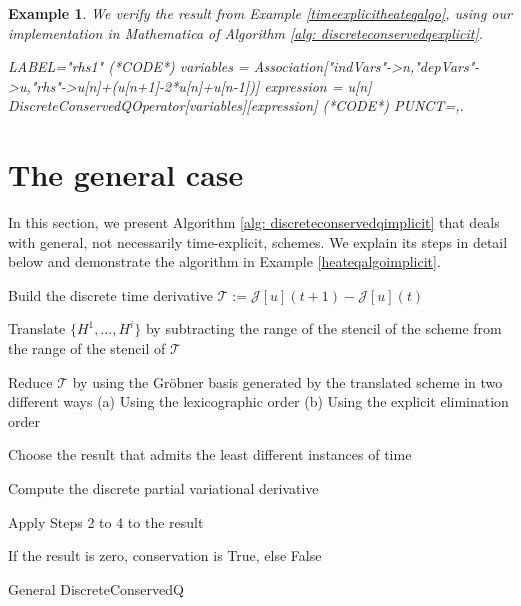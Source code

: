 \documentclass[manuscript]{acmart}
\newcommand{\Rr}{{\mathbb{R}}}
\newcommand{\Nn}{{\mathbb{N}}}
\newcommand{\1}{{\chi}}
\newcommand{\Ii}{{\mathcal{I}}}
\numberwithin{equation}{section}
\theoremstyle{thmlemcorr}
\numberwithin{theorem}{section}
\theoremstyle{thmlemcorr*}
\theoremstyle{defi}
\theoremstyle{remexample}
\newtheorem{example}[theorem]{Example}
\theoremstyle{ass}
\begin{document}
\begin{example}
	\label{heatex1}
	We verify the result from Example \ref{timeexplicitheateqalgo}, using our implementation in {\sc Mathematica} of Algorithm \ref{alg: discreteconservedqexplicit}.
	\begin{EXE}
		LABEL="rhs1"
		(*CODE*)
		variables = Association["indVars"->{n},"depVars"->{u},"rhs"->{u[n]+(u[n+1]-2*u[n]+u[n-1])}]
		expression = u[n]
		DiscreteConservedQOperator[variables][expression]
		(*CODE*)
		PUNCT={,.}
	\end{EXE}
	\begin{small}
		
		
	\end{small}
\end{example}
\section{The general case}
In this section, we present Algorithm \ref{alg: discreteconservedqimplicit} that deals with general, not necessarily time-explicit, schemes. We explain its steps in detail below and demonstrate the algorithm in Example \ref{heateqalgoimplicit}.\\
\begin{algorithm}
	\DontPrintSemicolon
	\KwIn{$\mathcal{J}\in\mathcal{F}(\mathcal{P}(\Ii\times\Nn,\Rr^m),\mathcal{D}(\Nn))$ and $\{H^1,\ldots,H^i\}\subset\mathcal{S}(\mathcal{P}(\Ii\times\Nn,\Rr^m),\mathcal{P}(\Ii\times\Nn,\Rr))$ }
	
	\label{step1} Build the discrete time derivative $\mathcal{T}:=\mathcal{J}[u](t+1)-\mathcal{J}[u](t)$\;

	\label{step2}Translate $\{H^1,\ldots,H^i\}$ by subtracting the range of the stencil of the scheme from the range of the stencil of $\mathcal{T}$\;
	
	\label{step3} Reduce $\mathcal{T}$ by using the Gr{\"o}bner basis generated by the translated scheme in two different ways
	\label{step3a} (a) Using the lexicographic order
	\label{step3b} (b) Using the explicit elimination order\;
	
	\label{step4} Choose the result that admits the least different instances of time\;
	
	\label{step5} Compute the discrete partial variational derivative\;
	
	\label{step6} Apply Steps 2 to 4 to the result\;
	
	\label{step7} If the result is zero, conservation is {\sc True}, else {\sc False}\;
	
	\caption{{\sc General DiscreteConservedQ}}
	\label{alg: discreteconservedqimplicit}
\end{algorithm}
\end{document}
